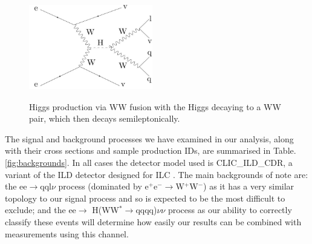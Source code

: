 \begin{figure}[h]
  \centering
  \includegraphics[width=0.48\textwidth,height=4.5cm,keepaspectratio]{figures/feynmann}
  \caption[Signal Feynmann Diagram]{Higgs production via WW fusion with the Higgs decaying to a WW pair, which then decays semileptonically.}
  \label{fig:feynmann}
\end{figure}


The signal and background processes we have examined in our analysis, along with their cross sections and sample production IDs, are summarised in Table. \ref{fig:backgrounds}. In all cases the detector model used is CLIC\_ILD\_CDR, a variant of the ILD detector designed for ILC \cite{CDR}. The main backgrounds of note are: the ee$\rightarrow$qql$\nu$ process (dominated by e$^+$e$^-\rightarrow$W$^+$W$^-$) as it has a very similar topology to our signal process and so is expected to be the most difficult to exclude; and the ee$\rightarrow$ H(WW$^*\rightarrow$qqqq)$\nu\nu$ process as our ability to correctly classify these events will determine how easily our results can be combined with measurements using this channel.

\renewcommand{\thefootnote}{\roman{footnote}}

